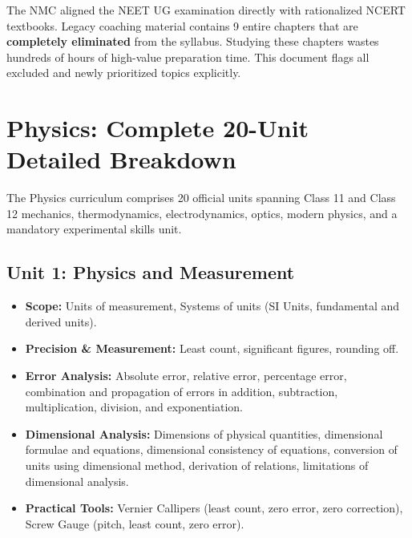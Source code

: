\documentclass[11pt,a4paper]{article}
\begin{document}
\begin{trapbox}
The NMC aligned the NEET UG examination directly with rationalized NCERT textbooks. Legacy coaching material contains 9 entire chapters that are \textbf{completely eliminated} from the syllabus. Studying these chapters wastes hundreds of hours of high-value preparation time. This document flags all excluded and newly prioritized topics explicitly.
\end{trapbox}

\vspace{5pt}
\tableofcontents
\vspace{10pt}
\newpage

\section{Physics: Complete 20-Unit Detailed Breakdown}

The Physics curriculum comprises 20 official units spanning Class 11 and Class 12 mechanics, thermodynamics, electrodynamics, optics, modern physics, and a mandatory experimental skills unit.

\subsection{Unit 1: Physics and Measurement}
\begin{itemize}
  \item \textbf{Scope:} Units of measurement, Systems of units (SI Units, fundamental and derived units).
  \item \textbf{Precision \& Measurement:} Least count, significant figures, rounding off.
  \item \textbf{Error Analysis:} Absolute error, relative error, percentage error, combination and propagation of errors in addition, subtraction, multiplication, division, and exponentiation.
  \item \textbf{Dimensional Analysis:} Dimensions of physical quantities, dimensional formulae and equations, dimensional consistency of equations, conversion of units using dimensional method, derivation of relations, limitations of dimensional analysis.
  \item \textbf{Practical Tools:} Vernier Callipers (least count, zero error, zero correction), Screw Gauge (pitch, least count, zero error).
\end{itemize}
\end{document}
